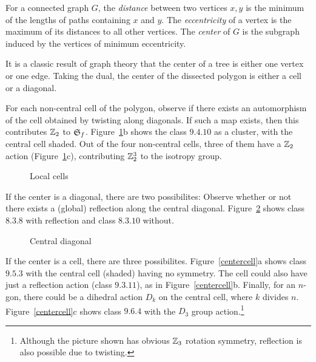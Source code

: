 \documentclass[10pt]{amsart}
\begin{document}
\begin{defn}
For a connected graph $G$, the {\em distance} between two vertices $x, y$ is the minimum of the lengths of paths containing $x$ and $y$. The {\em eccentricity} of a vertex is the maximum of its distances to all other vertices.  The {\em center} of $G$ is the subgraph induced by the vertices of minimum eccentricity.
\end{defn}

\noindent It is a classic result of graph theory that the center of a tree is either one vertex or one edge. Taking the dual, the center of the dissected polygon is either a cell or a diagonal.

 For each non-central cell of the polygon, observe if there exists an automorphism of the cell obtained by twisting along diagonals. If such a map exists, then this contributes ${\mathbb Z}_2$ to ${\mathfrak S}_f$.  Figure~\ref{localcell}b shows the class $9.4.10$ as a cluster, with the central cell shaded. Out of the four non-central cells, three of them have a ${\mathbb Z}_2$ action (Figure~\ref{localcell}c), contributing ${\mathbb Z}_2^3$ to the isotropy group.

\begin{figure}[h]
\caption{Local cells}
\label{localcell}
\end{figure}

 If the center is a diagonal, there are two possibilites: Observe whether or not there exists a (global) reflection along the central diagonal.  Figure~\ref{centerdiag} shows class $8.3.8$ with reflection and class $8.3.10$ without.

\begin{figure}[h]
\caption{Central diagonal}
\label{centerdiag}
\end{figure}

 If the center is a cell, there are three possibilites.  Figure~\ref{centercell}a shows class $9.5.3$ with the central cell (shaded) having no symmetry. The cell could also have just a reflection action (class $9.3.11$), as in Figure~\ref{centercell}b. Finally, for an $n$-gon, there could be a dihedral action $D_k$ on the central cell, where $k$ divides $n$.  Figure~\ref{centercell}c shows class $9.6.4$ with the $D_3$ group action.\footnote{Although the picture shown has obvious ${\mathbb Z}_3$ rotation symmetry, reflection is also possible due to twisting.}
\end{document}
